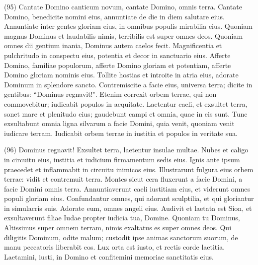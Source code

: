 \begin{biblechapter}  (95) 
\verse Cantate Domino canticum novum, cantate Domino, omnis terra. 
\verse Cantate Domino, benedicite nomini eius, annuntiate de die in diem salutare eius. 
\verse Annuntiate inter gentes gloriam eius, in omnibus populis mirabilia eius. 
\verse Quoniam magnus Dominus et laudabilis nimis, terribilis est super omnes deos. 
\verse Quoniam omnes dii gentium inania, Dominus autem caelos fecit. 
\verse Magnificentia et pulchritudo in conspectu eius, potentia et decor in sanctuario eius. 
\verse Afferte Domino, familiae populorum, afferte Domino gloriam et potentiam, 
\verse afferte Domino gloriam nominis eius. Tollite hostias et introite in atria eius, 
\verse adorate Dominum in splendore sancto. Contremiscite a facie eius, universa terra; 
\verse dicite in gentibus: “Dominus regnavit!". Etenim correxit orbem terrae, qui non commovebitur; iudicabit populos in aequitate. 
\verse Laetentur caeli, et exsultet terra, sonet mare et plenitudo eius; 
\verse gaudebunt campi et omnia, quae in eis sunt. Tunc exsultabunt omnia ligna silvarum 
\verse a facie Domini, quia venit, quoniam venit iudicare terram. Iudicabit orbem terrae in iustitia et populos in veritate sua. 
\end{biblechapter}

\begin{biblechapter}  (96) 
\verse Dominus regnavit! Exsultet terra, laetentur insulae multae. 
\verse Nubes et caligo in circuitu eius, iustitia et iudicium firmamentum sedis eius. 
\verse Ignis ante ipsum praecedet et inflammabit in circuitu inimicos eius. 
\verse Illustrarunt fulgura eius orbem terrae: vidit et contremuit terra. 
\verse Montes sicut cera fluxerunt a facie Domini, a facie Domini omnis terra. 
\verse Annuntiaverunt caeli iustitiam eius, et viderunt omnes populi gloriam eius. 
\verse Confundantur omnes, qui adorant sculptilia, et qui gloriantur in simulacris suis. Adorate eum, omnes angeli eius. 
\verse Audivit et laetata est Sion, et exsultaverunt filiae Iudae propter iudicia tua, Domine. 
\verse Quoniam tu Dominus, Altissimus super omnem terram, nimis exaltatus es super omnes deos. 
\verse Qui diligitis Dominum, odite malum; custodit ipse animas sanctorum suorum, de manu peccatoris liberabit eos. 
\verse Lux orta est iusto, et rectis corde laetitia. 
\verse Laetamini, iusti, in Domino et confitemini memoriae sanctitatis eius. 
\end{biblechapter}

